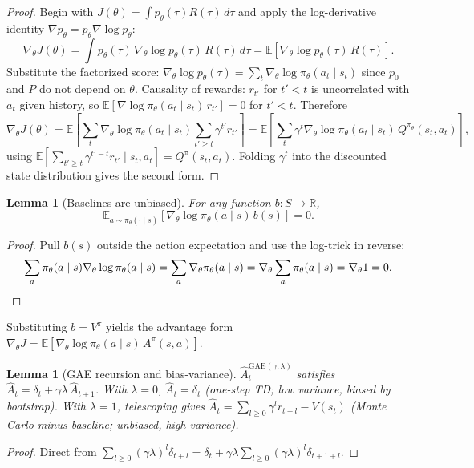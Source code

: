 \documentclass[11pt]{article}
\newtheorem{lemma}[theorem]{Lemma}
\theoremstyle{remark}
\begin{document}
\begin{proof}
Begin with $J(\theta)=\int p_\theta(\tau)R(\tau)\,d\tau$ and apply the log-derivative identity $\nabla p_\theta=p_\theta\nabla\log p_\theta$:
\[
\nabla_\theta J(\theta)=\int p_\theta(\tau)\,\nabla_\theta\log p_\theta(\tau)\,R(\tau)\,d\tau=\mathbb{E}[\nabla_\theta\log p_\theta(\tau)\,R(\tau)].
\]
Substitute the factorized score: $\nabla_\theta\log p_\theta(\tau)=\sum_t\nabla_\theta\log\pi_\theta(a_t\mid s_t)$ since $p_0$ and $P$ do not depend on $\theta$. Causality of rewards: $r_{t'}$ for $t'<t$ is uncorrelated with $a_t$ given history, so $\mathbb{E}[\nabla\log\pi_\theta(a_t\mid s_t)\,r_{t'}]=0$ for $t'<t$. Therefore
\[
\nabla_\theta J(\theta)=\mathbb{E}\!\left[\sum_t\nabla_\theta\log\pi_\theta(a_t\mid s_t)\sum_{t'\geq t}\gamma^{t'}r_{t'}\right]
=\mathbb{E}\!\left[\sum_t\gamma^t\nabla_\theta\log\pi_\theta(a_t\mid s_t)\,Q^{\pi_\theta}(s_t,a_t)\right],
\]
using $\mathbb{E}[\sum_{t'\geq t}\gamma^{t'-t}r_{t'}\mid s_t,a_t]=Q^\pi(s_t,a_t)$. Folding $\gamma^t$ into the discounted state distribution gives the second form.
\end{proof}

\begin{lemma}[Baselines are unbiased]
\label{lem:baseline}
For any function $b:S\to\mathbb{R}$,
\[
\mathbb{E}_{a\sim\pi_\theta(\cdot\mid s)}[\nabla_\theta\log\pi_\theta(a\mid s)\,b(s)]=0.
\]
\end{lemma}

\begin{proof}
Pull $b(s)$ outside the action expectation and use the log-trick in reverse:
\[
\sum_a\pi_\theta(a\mid s)\nabla_\theta\log\pi_\theta(a\mid s)=\sum_a\nabla_\theta\pi_\theta(a\mid s)=\nabla_\theta\sum_a\pi_\theta(a\mid s)=\nabla_\theta 1=0. \qedhere
\]
\end{proof}

Substituting $b=V^\pi$ yields the advantage form $\nabla_\theta J=\mathbb{E}[\nabla_\theta\log\pi_\theta(a\mid s)\,A^\pi(s,a)]$.

\begin{lemma}[GAE recursion and bias-variance]
$\hat A_t^{\mathrm{GAE}(\gamma,\lambda)}$ satisfies $\hat A_t=\delta_t+\gamma\lambda\,\hat A_{t+1}$. With $\lambda=0$, $\hat A_t=\delta_t$ (one-step TD; low variance, biased by bootstrap). With $\lambda=1$, telescoping gives $\hat A_t=\sum_{l\geq 0}\gamma^l r_{t+l}-V(s_t)$ (Monte Carlo minus baseline; unbiased, high variance).
\end{lemma}

\begin{proof}
Direct from $\sum_{l\geq 0}(\gamma\lambda)^l\delta_{t+l}=\delta_t+\gamma\lambda\sum_{l\geq 0}(\gamma\lambda)^l\delta_{t+1+l}$.
\end{proof}
\end{document}
